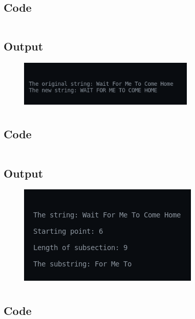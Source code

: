 \documentclass[12pt]{article}
\begin{document}
\newpage
\section{}
\subsection{Code}
\inputminted{c}{q17.c}
\subsection{Output}
\begin{figure}[h]
    \centering
    \includegraphics[width=0.75\textwidth]{17.png}
\end{figure}

\newpage
\section{}
\subsection{Code}
\inputminted{c}{q18.c}
\subsection{Output}
\begin{figure}[h]
    \centering
    \includegraphics{18.png}
\end{figure}
\newpage
\section{}
\subsection{Code}
\end{document}
